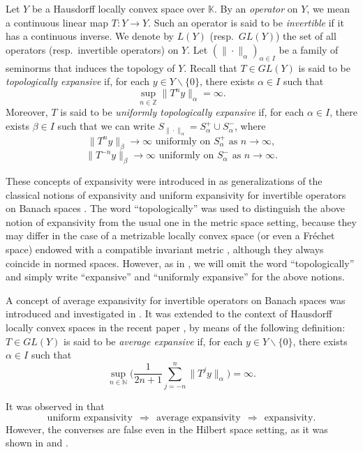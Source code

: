\documentclass[12pt]{article}
\theoremstyle{plain}
\theoremstyle{definition}
\newcommand{\N}{\mathbb{N}} %
\newcommand{\Z}{\mathbb{Z}} %
\newcommand{\K}{\mathbb{K}} %
\begin{document}
Let $Y$ be a Hausdorff locally convex space over $\K$.
By an {\em operator} on $Y$, we mean a continuous linear map $T: Y \to Y$.
Such an operator is said to be {\em invertible} if it has a continuous inverse.
We denote by $L(Y)$ (resp.\ $GL(Y)$) the set of all operators (resp.\ invertible operators) on $Y$.
Let $(\|\cdot\|_\alpha)_{\alpha \in I}$ be a family of seminorms that induces the topology of $Y$.
Recall that $T \in GL(Y)$ is said to be {\em topologically expansive} if, for each $y \in Y \backslash \{0\}$, 
there exists $\alpha \in I$ such that 
\[
\sup_{n \in \Z} \|T^n y\|_\alpha = \infty.
\]
Moreover, $T$ is said to be {\em uniformly topologically expansive} if, for each $\alpha \in I$, there exists $\beta \in I$ such that 
we can write $S_{\|\cdot\|_\alpha} = S^+_\alpha \cup S^-_\alpha$, where
\[
\|T^n y\|_\beta \to \infty \text{ uniformly on } S^+_\alpha \text{ as } n \to \infty,
\]
\[
\|T^{-n} y\|_\beta \to \infty \text{ uniformly on } S^-_\alpha \text{ as } n \to \infty.
\]

These concepts of expansivity were introduced in \cite{BerCarDarFavPer25} as generalizations of the classical notions 
of expansivity and uniform expansivity for invertible operators on Banach spaces \cite{MEisJHed70}.
The word ``topologically'' was used to distinguish the above notion of expansivity from the usual one in the metric space setting, 
because they may differ in the case of a metrizable locally convex space (or even a Fr\'echet space) endowed with a compatible invariant 
metric \cite[Example~32]{BerCarDarFavPer25}, although they always coincide in normed spaces.
However, as in \cite{BerMarRod}, we will omit the word ``topologically'' 
and simply write ``expansive'' and ``uniformly expansive'' for the above notions.

A concept of average expansivity for invertible operators on Banach spaces was introduced and investigated in \cite{AlvBerMes21}.
It was extended to the context of Hausdorff locally convex spaces in the recent paper \cite{BerMarRod}, by means of the following
definition: $T \in GL(Y)$ is said to be {\em average expansive} if, for each $y \in Y \backslash \{0\}$, there exists $\alpha \in I$ such that
\[
\sup_{n \in \N} \Big(\frac{1}{2n+1} \sum_{j=-n}^n \|T^j y\|_\alpha \Big) = \infty.
\]

It was observed in \cite[Proposition~2]{BerMarRod} that
\[
\text{uniform expansivity} \ \ \Longrightarrow \ \ \text{average expansivity} \ \ \Longrightarrow \ \ \text{expansivity}.
\]
However, the converses are false even in the Hilbert space setting, as it was shown in \cite[Example~16]{AlvBerMes21}
and \cite[Example~17]{AlvBerMes21}.
\end{document}
